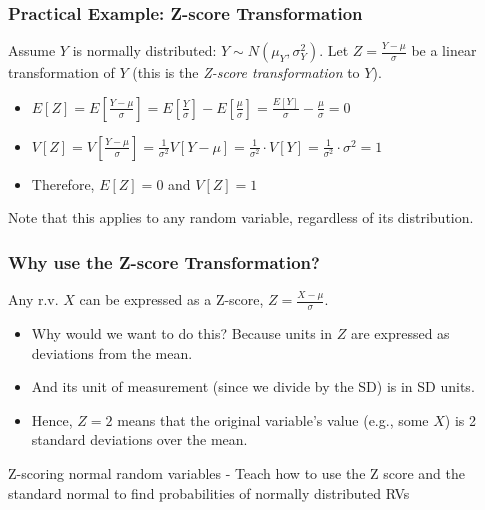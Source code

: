 \documentclass[handout]{beamer} %
\begin{document}
\begin{frame} %
\frametitle{Practical Example: Z-score Transformation}

Assume $Y$ is normally distributed: $Y \sim N(\mu_Y, \sigma_Y^2)$. Let $Z = \frac{Y - \mu}{\sigma}$ be a linear transformation of $Y$ (this is the \emph{Z-score transformation} to $Y$).
\pause

\begin{itemize}
    \item $E[Z] = E[\frac{Y - \mu}{\sigma}] = E[\frac{Y}{\sigma} ] - E[\frac{\mu}{\sigma}] =  \frac{E[Y]}{\sigma} - \frac{\mu}{\sigma} =   0$
\pause
    \item $V[Z] = V[\frac{Y - \mu}{\sigma}] = \frac{1}{\sigma^2}  V[Y - \mu]   = \frac{1}{\sigma^2} \cdot V[Y] = \frac{1}{\sigma^2} \cdot  \sigma^2 =  1$
\pause
    \item Therefore, $E[Z] = 0$ and $V[Z] = 1$
\pause
\end{itemize}
Note that this applies to any random variable, regardless of its distribution.
\end{frame}

\begin{frame} %
\frametitle{Why use the Z-score Transformation?}

Any r.v. $X$ can be expressed as a Z-score, $Z = \frac{X - \mu}{\sigma}$.

\begin{itemize}
    \item Why would we want to do this? Because units in $Z$ are expressed as deviations from the mean.
    \item And its unit of measurement (since we divide by the SD) is in SD units.
    \item Hence, $Z=2$ means that the original variable's value (e.g., some $X$) is 2 standard deviations over the mean.
\end{itemize}
\end{frame}

\begin{frame}{Z-scoring normal random variables}
    - Teach how to use the Z score and the standard normal to find probabilities of normally distributed RVs
\end{frame}
\end{document}
